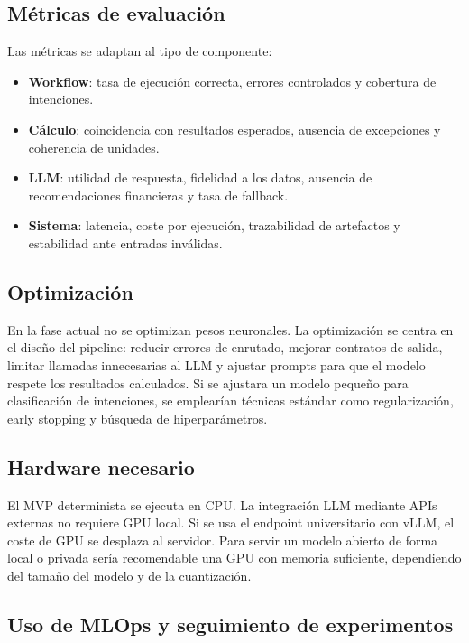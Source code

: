 \documentclass[11pt,a4paper]{article}
\begin{document}
\subsection{M\'etricas de evaluaci\'on}

Las m\'etricas se adaptan al tipo de componente:

\begin{itemize}
    \item \textbf{Workflow}: tasa de ejecuci\'on correcta, errores controlados y cobertura de intenciones.
    \item \textbf{C\'alculo}: coincidencia con resultados esperados, ausencia de excepciones y coherencia de unidades.
    \item \textbf{LLM}: utilidad de respuesta, fidelidad a los datos, ausencia de recomendaciones financieras y tasa de fallback.
    \item \textbf{Sistema}: latencia, coste por ejecuci\'on, trazabilidad de artefactos y estabilidad ante entradas inv\'alidas.
\end{itemize}

\subsection{Optimizaci\'on}

En la fase actual no se optimizan pesos neuronales. La optimizaci\'on se centra en el dise\~no del pipeline: reducir errores de enrutado, mejorar contratos de salida, limitar llamadas innecesarias al LLM y ajustar prompts para que el modelo respete los resultados calculados. Si se ajustara un modelo peque\~no para clasificaci\'on de intenciones, se emplear\'ian t\'ecnicas est\'andar como regularizaci\'on, early stopping y b\'usqueda de hiperpar\'ametros.

\subsection{Hardware necesario}

El MVP determinista se ejecuta en CPU. La integraci\'on LLM mediante APIs externas no requiere GPU local. Si se usa el endpoint universitario con vLLM, el coste de GPU se desplaza al servidor. Para servir un modelo abierto de forma local o privada ser\'ia recomendable una GPU con memoria suficiente, dependiendo del tama\~no del modelo y de la cuantizaci\'on.

\subsection{Uso de MLOps y seguimiento de experimentos}
\end{document}
